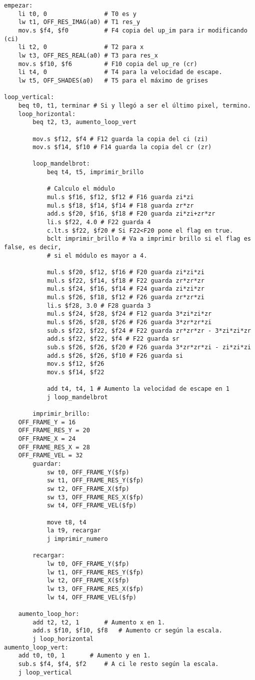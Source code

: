 \documentclass[a4paper,10pt]{article}
\begin{document}
\begin{verbatim}
empezar:
	li t0, 0 				# T0 es y
	lw t1, OFF_RES_IMAG(a0) # T1 res_y
	mov.s $f4, $f0 			# F4 copia del up_im para ir modificando (ci)
	li t2, 0 				# T2 para x
	lw t3, OFF_RES_REAL(a0) # T3 para res_x
	mov.s $f10, $f6 		# F10 copia del up_re (cr)
	li t4, 0 				# T4 para la velocidad de escape.
	lw t5, OFF_SHADES(a0)	# T5 para el máximo de grises

loop_vertical:
	beq t0, t1, terminar # Si y llegó a ser el último pixel, termino.
	loop_horizontal:
		beq t2, t3, aumento_loop_vert

		mov.s $f12, $f4 # F12 guarda la copia del ci (zi)
		mov.s $f14, $f10 # F14 guarda la copia del cr (zr)

		loop_mandelbrot:
			beq t4, t5, imprimir_brillo

			# Calculo el módulo
			mul.s $f16, $f12, $f12 # F16 guarda zi*zi
			mul.s $f18, $f14, $f14 # F18 guarda zr*zr
			add.s $f20, $f16, $f18 # F20 guarda zi*zi+zr*zr
			li.s $f22, 4.0 # F22 guarda 4
			c.lt.s $f22, $f20 # Si F22<F20 pone el flag en true.
			bclt imprimir_brillo # Va a imprimir brillo si el flag es false, es decir,
			# si el módulo es mayor a 4.

			mul.s $f20, $f12, $f16 # F20 guarda zi*zi*zi
			mul.s $f22, $f14, $f18 # F22 guarda zr*zr*zr
			mul.s $f24, $f16, $f14 # F24 guarda zi*zi*zr
			mul.s $f26, $f18, $f12 # F26 guarda zr*zr*zi
			li.s $f28, 3.0 # F28 guarda 3
			mul.s $f24, $f28, $f24 # F12 guarda 3*zi*zi*zr
			mul.s $f26, $f28, $f26 # F26 guarda 3*zr*zr*zi
			sub.s $f22, $f22, $f24 # F22 guarda zr*zr*zr - 3*zi*zi*zr
			add.s $f22, $f22, $f4 # F22 guarda sr
			sub.s $f26, $f26, $f20 # F26 guarda 3*zr*zr*zi - zi*zi*zi
			add.s $f26, $f26, $f10 # F26 guarda si
			mov.s $f12, $f26
			mov.s $f14, $f22

			add t4, t4, 1 # Aumento la velocidad de escape en 1
			j loop_mandelbrot

		imprimir_brillo:
	OFF_FRAME_Y = 16
	OFF_FRAME_RES_Y = 20
	OFF_FRAME_X = 24
	OFF_FRAME_RES_X = 28
	OFF_FRAME_VEL = 32
		guardar:	
			sw t0, OFF_FRAME_Y($fp)
			sw t1, OFF_FRAME_RES_Y($fp)
			sw t2, OFF_FRAME_X($fp)
			sw t3, OFF_FRAME_RES_X($fp)
			sw t4, OFF_FRAME_VEL($fp)
			
			move t8, t4
			la t9, recargar
			j imprimir_numero
		
		recargar:
			lw t0, OFF_FRAME_Y($fp)
			lw t1, OFF_FRAME_RES_Y($fp)
			lw t2, OFF_FRAME_X($fp)
			lw t3, OFF_FRAME_RES_X($fp)
			lw t4, OFF_FRAME_VEL($fp)

	aumento_loop_hor:
		add t2, t2, 1 		# Aumento x en 1.
		add.s $f10, $f10, $f8 	# Aumento cr según la escala.
		j loop_horizontal
aumento_loop_vert:
	add t0, t0, 1 		# Aumento y en 1.
	sub.s $f4, $f4, $f2 	# A ci le resto según la escala.
	j loop_vertical



\end{verbatim}
\end{document}
